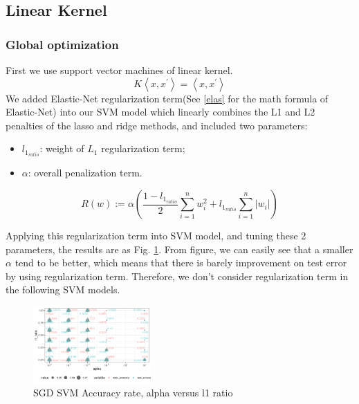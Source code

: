 \documentclass[conference]{IEEEtran}
\begin{document}

\subsection{Linear Kernel}
\subsubsection{Global optimization}\label{svmlkgo}
First we use support vector machines of linear kernel. 
$$
K\left\langle x, x^{\prime}\right\rangle=\left\langle x, x^{\prime}\right\rangle
$$
We added Elastic-Net regularization term\cite{james2013introduction}(See \eqref{elas} for the math formula of Elastic-Net) into our SVM model which linearly combines the L1 and L2 penalties of the lasso and ridge methods, and included two parameters:
\begin{itemize}
  \item $l_{1_{ratio}}$: weight of $L_1$ regularization term;
  \item $\alpha$: overall penalization term.
\end{itemize}
\begin{equation}\label{elas}
	R(w) := \alpha(\frac{1-l_{1_{ratio}}}{2} \sum_{i=1}^{n} w_i^2 + l_{1_{ratio}} \sum_{i=1}^{n} |w_i|)
\end{equation}

Applying this regularization term into SVM model, and tuning these 2 parameters, the results are as Fig. \ref{SGD SVM Accuracy rate, alpha versus l1 ratio}. From figure, we can easily see that a smaller $\alpha$ tend to be better, which means that there is barely improvement on test error by using regularization term. Therefore, we don't consider regularization term in the following SVM models.  
\begin{figure}[htbp]
\centerline{\includegraphics[width=0.4\textwidth]{figure/SGD SVM Accuracy rate, alpha versus l1_ratio.png}}
\caption{SGD SVM Accuracy rate, alpha versus l1 ratio}
\label{SGD SVM Accuracy rate, alpha versus l1 ratio}
\end{figure}
\end{document}
